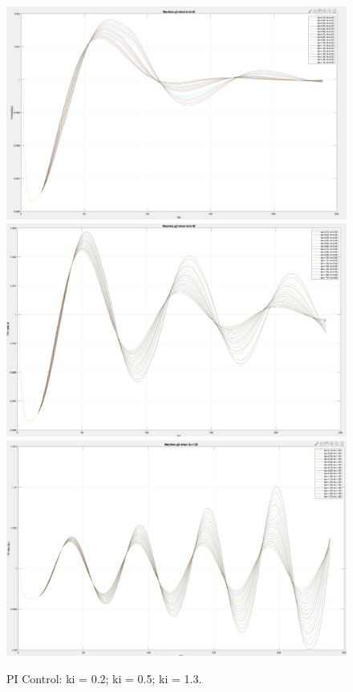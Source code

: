 \documentclass{report}
\begin{document}
\begin{figure}[!htbp]
  \includegraphics[width= \linewidth]{figure/3_4_1_tune_ki_1.png}
\endminipage\hfill
{}
  \includegraphics[width= \linewidth]{figure/3_4_1_tune_ki_2.jpeg}
\endminipage\hfill
{}%
  \includegraphics[width= \linewidth]{figure/3_4_1_tune_ki_3.jpeg}
\endminipage
\caption{PI Control: ki = 0.2; ki = 0.5; ki = 1.3.}
\label{3_4_1_larger_ki}
\end{figure}
\end{document}
